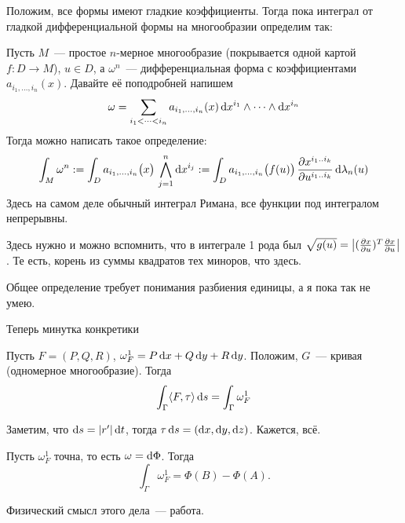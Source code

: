\documentclass[12pt,draft,timbord]{longnotes}
\begin{document}
\underdev{}

Положим, все формы имеют гладкие коэффициенты.
Тогда пока интеграл от гладкой дифференциальной формы на многообразии определим так:
\begin{defn}\label{defn:dg::secint::difformint}
  Пусть $M$~--- простое $n$-мерное многообразие (покрывается одной картой $f\colon D \to M$),
  $u\in D$,
  а $\omega^n$~--- дифференциальная форма с коэффициентами $a_{i_1, \dotsc, i_n}(x)$.
  Давайте её поподробней напишем
  \[
    \omega =\sum_{i_{1}<\cdots <i_{n}}
    a_{i_1,\dotsc ,i_n} (x) \,\mathrm{d} x^{i_1} \wedge \dotsm \wedge \mathrm{d} x^{i_n}
  \]
  Тогда можно написать такое определение:
  \[ 
    \int_M \omega^n 
    := \int_D a_{i_1,\dotsc ,i_n}\bigl(x\bigr) 
    \, \bigwedge_{j=1}^n \mathrm{d} x^{i_j} 
    := \int_D a_{i_1,\dotsc ,i_n}\bigl(f(u)\bigr) 
    \, \frac{\partial x^{i_1 \mathbin{..} i_k}}{\partial u^{i_1 \mathbin{..} i_k }} \, \mathrm{d} \lambda_n(u) 
  \]
  Здесь на самом деле обычный интеграл Римана, все функции под интегралом непрерывны.
\end{defn}
\begin{rem}\label{rem:dg::secint::noord}
  Здесь нужно и можно вспомнить, что в интеграле 1 рода был 
  $\sqrt{g(u)} = \left|(\frac{\partial x}{\partial u})^T\frac{\partial x}{\partial u}\right|$. Те есть, корень из суммы квадратов
  тех миноров, что здесь.
\end{rem}
Общее определение требует понимания разбиения единицы, а я пока так не умею.

Теперь минутка конкретики

\begin{prop}\label{prop:dg::secint::diffrmline}
  Пусть $F=(P,Q,R)$, $\omega_F^1 = P\, \mathrm{d} x + Q \, \mathrm{d} y + R\, \mathrm{d} y$.
  Положим, $G$~--- кривая (одномерное многообразие).
  Тогда
  \[
    \int_ \Gamma \langle F,\tau \rangle\, \mathrm{d} s = \int_\Gamma \omega_F^1
  \]
\end{prop}
\begin{lproof}
  Заметим, что $\mathrm{d} s = |r'|\, \mathrm{d} t$, тогда $\tau \,\mathrm{d} s = (\mathrm{d} x, \mathrm{d} y, \mathrm{d} z)$.
  Кажется, всё.
\end{lproof}

\begin{prop}\label{prop:dg::secint::prec}
  Пусть $\omega_F^1$ точна, то есть $\omega = \mathrm{d} \Phi$. Тогда \[
    \int_\Gamma \omega_F^1 = \Phi(B) - \Phi (A).
  \]
\end{prop}

Физический смысл этого дела~--- работа.
\end{document}
